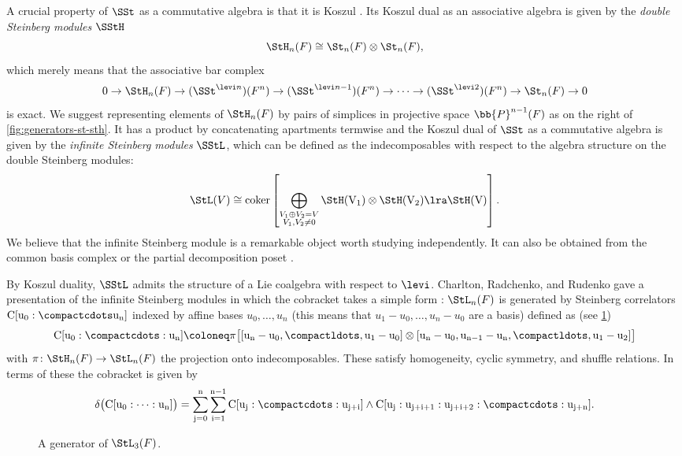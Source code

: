 \documentclass[a4paper]{amsart}
\begin{document}
A crucial property of $\SSt$ as a commutative algebra is that it is Koszul \cite{MNP,MPW23,CharltonRadchenkoRudenko}. Its Koszul dual as an associative algebra is given by the \emph{double Steinberg modules} $\SStH$ 
\[\StH_n(F) \cong \St_n(F) \otimes \St_n(F),\] 
which merely means that the associative bar complex
\[0 \to \StH_n(F) \to (\SSt^{\levi n})(F^n) \to (\SSt^{\levi n-1})(F^n) \to \cdots \to (\SSt^{\levi 2})(F^n) \to \St_n(F) \to 0\]
is exact. We suggest representing elements of $\StH_n(F)$ by pairs of simplices in projective space $\bb{P}^{n-1}(F)$ as on the right of \cref{fig:generators-st-sth}. It has a product by concatenating apartments termwise and the Koszul dual of $\SSt$ as a commutative algebra is given by the \emph{infinite Steinberg modules} $\SStL$, which can be defined as the indecomposables with respect to the algebra structure on the double Steinberg modules:
\[\StL(V) \cong \rm{coker}\left[\bigoplus_{\substack{V_1 \oplus V_2 = V \\ V_1,V_2 \neq 0}} \StH(V_1)\otimes \StH(V_2) \lra \StH(V)\right].\]
We believe that the infinite Steinberg module is a remarkable object worth studying independently. It can also be obtained from the common basis complex \cite{Rognes} or the partial decomposition poset \cite{HHS,BPW}.

By Koszul duality, $\SStL$ admits the structure of a Lie coalgebra with respect to $\levi$. Charlton, Radchenko, and Rudenko gave a presentation of the infinite Steinberg modules in which the cobracket takes a simple form \cite[Section 2]{CharltonRadchenkoRudenko}: $\StL_n(F)$ is generated by Steinberg correlators $\rm{C}[u_0: \compactcdots u_n]$ indexed by affine bases $u_0,\ldots,u_n$ (this means that $u_1-u_0,\ldots,u_n-u_0$ are a basis) defined as (see \cref{fig:generator-stl})
\[\rm{C}[u_0: \compactcdots: u_n] \coloneq \pi\big[[u_n-u_0,\compactldots,u_1-u_0] \otimes [u_n-u_0,u_{n-1}-u_n,\compactldots,u_1-u_2]\big]\]
with $\pi \colon \StH_n(F) \to \StL_n(F)$ the projection onto indecomposables. These satisfy homogeneity, cyclic symmetry, and shuffle relations. In terms of these the cobracket is given by
\[\delta\big(\rm{C}[u_0:\cdots:u_n]\big) = \sum_{j=0}^n \sum_{i=1}^{n-1} \rm{C}[u_j:\compactcdots:u_{j+i}] \wedge \rm{C}[u_j:u_{j+i+1}:u_{j+i+2}:\compactcdots:u_{j+n}].\]

\begin{figure}
\caption{A generator of $\StL_3(F)$.}
\label{fig:generator-stl} \end{figure}
\end{document}
